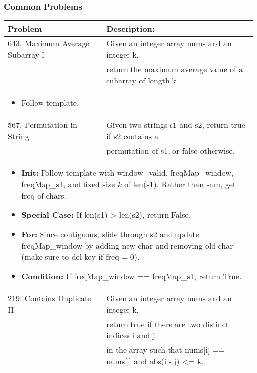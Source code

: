 \subsubsection{Common Problems}
\begin{summary}
    \begin{center}
        \begin{tabular}{ll}
            \toprule
            \textbf{Problem} & \textbf{Description:} \\
            \midrule
            643. Maximum Average Subarray I & Given an integer array nums and an integer k, \\
            & return the maximum average value of a subarray of length k. \\
            \multicolumn{2}{p{\linewidth}}{
                \begin{itemize}
                    \item Follow template. 
                \end{itemize}
            } \\
            \midrule
            567. Permutation in String & Given two strings s1 and s2, return true if s2 contains a \\
            & permutation of s1, or false otherwise. \\
            \multicolumn{2}{p{\linewidth}}{
                \begin{itemize}
                    \item \textbf{Init:} Follow template with window\_valid, freqMap\_window, freqMap\_s1, and fixed size $k$ of len(s1). Rather than sum, get freq of chars. 
                    \item \textbf{Special Case:} If len(s1) > len(s2), return False.
                    \item \textbf{For:} Since contiguous, slide through s2 and update freqMap\_window by adding new char and removing old char (make sure to del key if freq = 0).
                    \item \textbf{Condition:} If freqMap\_window == freqMap\_s1, return True.
                \end{itemize}
            } \\
            \midrule
            219. Contains Duplicate II & Given an integer array nums and an integer k, \\
            & return true if there are two distinct indices i and j \\
            & in the array such that nums[i] == nums[j] and abs(i - j) <= k. \\

\end{tabular}
\end{center}
\end{summary}
